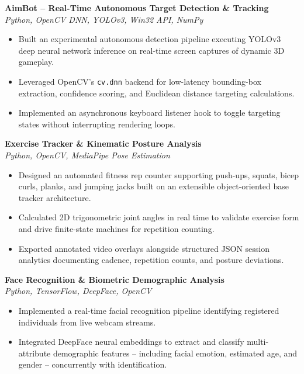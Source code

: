 \documentclass[a4paper,10pt]{article}
\begin{document}
\vspace{3pt}
\textbf{AimBot -- Real-Time Autonomous Target Detection \& Tracking} \\
\textit{Python, OpenCV DNN, YOLOv3, Win32 API, NumPy}
\begin{itemize}
    \item Built an experimental autonomous detection pipeline executing YOLOv3 deep neural network inference on real-time screen captures of dynamic 3D gameplay.
    \item Leveraged OpenCV's \texttt{cv.dnn} backend for low-latency bounding-box extraction, confidence scoring, and Euclidean distance targeting calculations.
    \item Implemented an asynchronous keyboard listener hook to toggle targeting states without interrupting rendering loops.
\end{itemize}

\vspace{3pt}
\textbf{Exercise Tracker \& Kinematic Posture Analysis} \\
\textit{Python, OpenCV, MediaPipe Pose Estimation}
\begin{itemize}
    \item Designed an automated fitness rep counter supporting push-ups, squats, bicep curls, planks, and jumping jacks built on an extensible object-oriented base tracker architecture.
    \item Calculated 2D trigonometric joint angles in real time to validate exercise form and drive finite-state machines for repetition counting.
    \item Exported annotated video overlays alongside structured JSON session analytics documenting cadence, repetition counts, and posture deviations.
\end{itemize}

\vspace{3pt}
\textbf{Face Recognition \& Biometric Demographic Analysis} \\
\textit{Python, TensorFlow, DeepFace, OpenCV}
\begin{itemize}
    \item Implemented a real-time facial recognition pipeline identifying registered individuals from live webcam streams.
    \item Integrated DeepFace neural embeddings to extract and classify multi-attribute demographic features -- including facial emotion, estimated age, and gender -- concurrently with identification.
\end{itemize}
\end{document}
